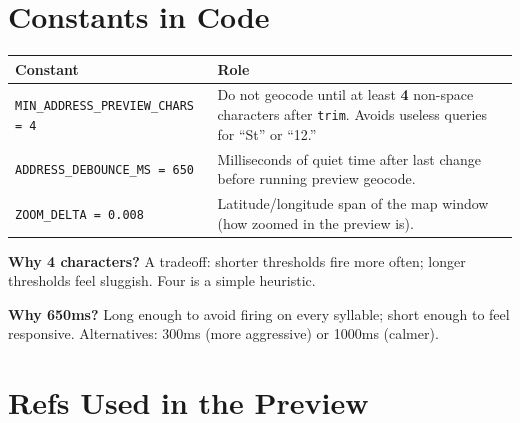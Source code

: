 \documentclass[11pt,a4paper]{article}
\begin{document}
\section{Constants in Code}

\begin{center}
\begin{tabular}{@{}ll@{}}
\toprule
\textbf{Constant} & \textbf{Role} \\
\midrule
\texttt{MIN\_ADDRESS\_PREVIEW\_CHARS = 4} & Do not geocode until at least \textbf{4} non-space characters after \texttt{trim}. Avoids useless queries for ``St'' or ``12.'' \\
\texttt{ADDRESS\_DEBOUNCE\_MS = 650} & Milliseconds of quiet time after last change before running preview geocode. \\
\texttt{ZOOM\_DELTA = 0.008} & Latitude/longitude span of the map window (how zoomed in the preview is). \\
\bottomrule
\end{tabular}
\end{center}

\textbf{Why 4 characters?} A tradeoff: shorter thresholds fire more often; longer thresholds feel sluggish. Four is a simple heuristic.

\textbf{Why 650ms?} Long enough to avoid firing on every syllable; short enough to feel responsive. Alternatives: 300ms (more aggressive) or 1000ms (calmer).

\section{Refs Used in the Preview}
\end{document}
